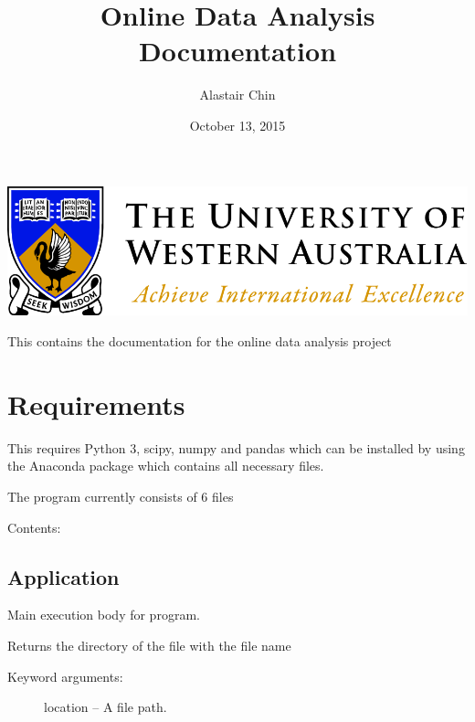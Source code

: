 \documentclass[letterpaper,10pt,english]{sphinxmanual}
\title{Online Data Analysis Documentation}
\date{October 13, 2015}
\author{Alastair Chin}
\begin{document}
\maketitle
\tableofcontents
{}\label{index::doc}


\includegraphics{UWA-logo.png}

This contains the documentation for the online data analysis project


\chapter{Requirements}
\label{index:requirements}\label{index:welcome-to-online-data-analysis-s-documentation}
This requires Python 3, scipy, numpy and pandas which can be installed
by using the Anaconda package which contains all necessary files.

The program currently consists of 6 files

Contents:


\section{Application}
\label{Code_rst/app:module-application}\label{Code_rst/app::doc}\label{Code_rst/app:application}
Main execution body for program.

\begin{fulllineitems}
\label{Code_rst/app:application.get_file_dir}
Returns the directory of the file with the file name
\begin{description}
\item[{Keyword arguments:}] \leavevmode
location -- A file path.

\end{description}

\end{fulllineitems}

\end{document}
